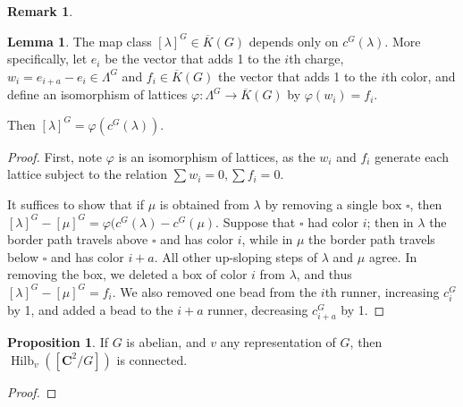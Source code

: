 \documentclass{amsart}[12pt]
\theoremstyle{definition}
\newtheorem{lemma}[dummy]{Lemma}
\newtheorem{remark}[dummy]{Remark}
\newtheorem{proposition}[dummy]{Proposition}
\newcommand{\C}{\mathbf{C}}
\DeclareMathOperator{\Hilb}{Hilb}
\begin{document}
\begin{remark}
\begin{center}
\end{center}



\begin{lemma}
  The map class $[\lambda]^G\in\overline{K}(G)$ depends only on $c^G(\lambda)$.  
More specifically, let $e_i$ be the vector that adds 1 to the $i$th charge, $w_i=e_{i+a}-e_i\in\Lambda^G$ and $f_i\in\overline{K}(G)$ the vector that adds 1 to the $i$th color, and define an isomorphism of lattices $\varphi:\Lambda^G\to\overline{K}(G)$ by $\varphi(w_i)=f_i$.

Then $[\lambda]^G=\varphi(c^G(\lambda))$.
\end{lemma}

\begin{proof}
First, note $\varphi$ is an isomorphism of lattices, as the $w_i$ and $f_i$ generate each lattice subject to the relation $\sum w_i=0, \sum f_i=0$.

It suffices to show that if $\mu$ is obtained from $\lambda$ by removing a single box $\square$, then $[\lambda]^G-[\mu]^G=\varphi(c^G(\lambda)-c^G(\mu)$.  Suppose that $\square$ had color $i$; then in $\lambda$ the border path travels above $\square$ and has color $i$, while in $\mu$ the border path travels below $\square$ and has color $i+a$.  All other up-sloping steps of $\lambda$ and $\mu$ agree.  In removing the box, we deleted a box of color $i$ from $\lambda$, and thus $[\lambda]^G-[\mu]^G=f_i$.  We also removed one bead from the $i$th runner, increasing $c^G_i$ by 1, and added a bead to the $i+a$ runner, decreasing $c^G_{i+a}$ by 1.


\end{proof}


\begin{proposition} \label{prop:connected}
If $G$ is abelian, and $v$ any representation of $G$, then $\Hilb_v([\C^2/G])$ is connected.  
\end{proposition}
\begin{proof}


\end{proof}
\end{remark}
\end{document}
